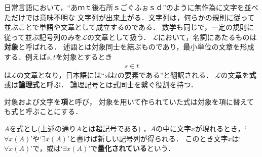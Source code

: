 	日常言語において，``あｍｔ後右所ｓごぐふぉｓｄ''のように無作為に文字を並べただけでは意味不明な
	文字列が出来上がる．文字列は，何らかの規則に従って並ぶことで単語や文章として成立するのである．
	数学も同じで，一定の規則に従って並ぶ記号列のみを$\mathcal{L}$の文章として扱う．
	$\mathcal{L}$において，名詞にあたるものは{\bf 対象}と呼ばれる．
	述語とは対象同士を結ぶものであり，最小単位の文章を形成する．例えば$s,t$を対象とするとき
	\begin{align}
		s \in t
	\end{align}
	は$\mathcal{L}$の文章となり，日本語には``$s$は$t$の要素である''と翻訳される．
	$\mathcal{L}$の文章を{\bf 式}或は{\bf 論理式}と呼ぶ．
	論理記号とは式同士を繋ぐ役割を持つ．
	
	
	対象および文字を{\bf 項}と呼び，
	対象を用いて作られていた式は対象を項に替えても式と呼ぶことにする．
	
	$A$を式とし(上述の通り$A$とは超記号である)
	，$A$の中に文字$x$が現れるとき，`$\forall x (A)$'や`$\exists x (A)$'と書けば新しい記号列が得られる．
	このとき文字$x$は`$\forall x (A)$'で，或は`$\exists x (A)$'で{\bf 量化されている}という．
	
